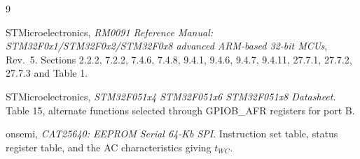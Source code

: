 \documentclass[conference]{IEEEtran}
\begin{document}
\begin{thebibliography}{9}

STMicroelectronics, \emph{RM0091 Reference Manual: STM32F0x1/STM32F0x2/STM32F0x8
advanced ARM-based 32-bit MCUs}, Rev.\ 5. Sections 2.2.2, 7.2.2, 7.4.6, 7.4.8,
9.4.1, 9.4.6, 9.4.7, 9.4.11, 27.7.1, 27.7.2, 27.7.3 and Table 1.

STMicroelectronics, \emph{STM32F051x4 STM32F051x6 STM32F051x8 Datasheet}.
Table 15, alternate functions selected through GPIOB\_AFR registers for port B.

onsemi, \emph{CAT25640: EEPROM Serial 64-Kb SPI}. Instruction set table, status
register table, and the AC characteristics giving $t_{WC}$.

\end{thebibliography}
\end{document}
